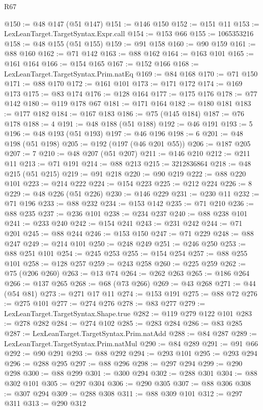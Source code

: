 \begin{lexlean}{R67}
\begin{coremodule}
@150 := @48 @147 (@51 @147)
@151 := @146 @150
@152 := @151 @11
@153 := LexLeanTarget.TargetSyntax.Expr.call
@154 := @153 @66
@155 := 1065353216
@158 := @48 @155 (@51 @155)
@159 := @91 @158
@160 := @90 @159
@161 := @88 @160
@162 := @71 @142
@163 := @88 @162
@164 := @163 @101
@165 := @161 @164
@166 := @154 @165
@167 := @152 @166
@168 := LexLeanTarget.TargetSyntax.Prim.natEq
@169 := @84 @168
@170 := @71 @150
@171 := @88 @170
@172 := @161 @101
@173 := @171 @172
@174 := @169 @173
@175 := @83 @174
@176 := @128 @164
@177 := @175 @176
@178 := @77 @142
@180 := @119 @178 @67
@181 := @171 @164
@182 := @180 @181
@183 := @177 @182
@184 := @167 @183
@186 := @75 (@145 @184)
@187 := @76 @178
@188 := 4
@191 := @48 @188 (@51 @188)
@192 := @46 @191
@193 := 5
@196 := @48 @193 (@51 @193)
@197 := @46 @196
@198 := 6
@201 := @48 @198 (@51 @198)
@205 := @192 (@197 (@46 @201 @55))
@206 := @187 @205
@207 := 7
@210 := @48 @207 (@51 @207)
@211 := @146 @210
@212 := @211 @11
@213 := @71 @191
@214 := @88 @213
@215 := 3212836864
@218 := @48 @215 (@51 @215)
@219 := @91 @218
@220 := @90 @219
@222 := @88 @220 @101
@223 := @214 @222
@224 := @154 @223
@225 := @212 @224
@226 := 8
@229 := @48 @226 (@51 @226)
@230 := @146 @229
@231 := @230 @11
@232 := @71 @196
@233 := @88 @232
@234 := @153 @142
@235 := @71 @210
@236 := @88 @235
@237 := @236 @101
@238 := @234 @237
@240 := @88 @238 @101
@241 := @233 @240
@242 := @154 @241
@243 := @231 @242
@244 := @71 @201
@245 := @88 @244
@246 := @153 @150
@247 := @71 @229
@248 := @88 @247
@249 := @214 @101
@250 := @248 @249
@251 := @246 @250
@253 := @88 @251 @101
@254 := @245 @253
@255 := @154 @254
@257 := @88 @255 @101
@258 := @128 @257
@259 := @243 @258
@260 := @225 @259
@262 := @75 (@206 @260)
@263 := @13 @74
@264 := @262 @263
@265 := @186 @264
@266 := @137 @265
@268 := @68 (@73 @266)
@269 := @43 @268
@271 := @44 (@54 @81)
@273 := @271 @17 @11
@274 := @153 @191
@275 := @88 @72
@276 := @275 @101
@277 := @274 @276
@278 := @83 @277
@279 := LexLeanTarget.TargetSyntax.Shape.true
@282 := @119 @279 @122 @101
@283 := @278 @282
@284 := @274 @102
@285 := @283 @284
@286 := @83 @285
@287 := LexLeanTarget.TargetSyntax.Prim.natAdd
@288 := @84 @287
@289 := LexLeanTarget.TargetSyntax.Prim.natMul
@290 := @84 @289
@291 := @91 @66
@292 := @90 @291
@293 := @88 @292
@294 := @293 @101
@295 := @293 @294
@296 := @288 @295
@297 := @88 @296
@298 := @297 @294
@299 := @290 @298
@300 := @88 @299
@301 := @300 @294
@302 := @288 @301
@304 := @88 @302 @101
@305 := @297 @304
@306 := @290 @305
@307 := @88 @306
@308 := @307 @294
@309 := @288 @308
@311 := @88 @309 @101
@312 := @297 @311
@313 := @290 @312

\end{coremodule}
\end{lexlean}
